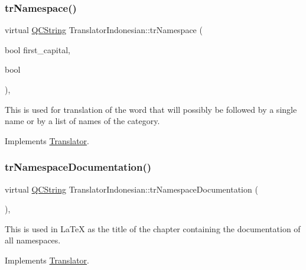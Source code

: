 \subsubsection{\texorpdfstring{trNamespace()}{trNamespace()}}
{\footnotesize\ttfamily virtual \mbox{\hyperlink{class_q_c_string}{Q\+C\+String}} Translator\+Indonesian\+::tr\+Namespace (\begin{DoxyParamCaption}\item[{bool}]{first\+\_\+capital,  }\item[{bool}]{ }\end{DoxyParamCaption})\hspace{0.3cm}{\ttfamily [inline]}, {\ttfamily [virtual]}}

This is used for translation of the word that will possibly be followed by a single name or by a list of names of the category. 

Implements \mbox{\hyperlink{class_translator}{Translator}}.

\mbox{\label{class_translator_indonesian_acdae57e8cc8cc1d1e559900133fe6842}} 
\subsubsection{\texorpdfstring{trNamespaceDocumentation()}{trNamespaceDocumentation()}}
{\footnotesize\ttfamily virtual \mbox{\hyperlink{class_q_c_string}{Q\+C\+String}} Translator\+Indonesian\+::tr\+Namespace\+Documentation (\begin{DoxyParamCaption}{ }\end{DoxyParamCaption})\hspace{0.3cm}{\ttfamily [inline]}, {\ttfamily [virtual]}}

This is used in La\+TeX as the title of the chapter containing the documentation of all namespaces. 

Implements \mbox{\hyperlink{class_translator}{Translator}}.

\mbox{\label{class_translator_indonesian_aeac68f0ab9978e6fc2f8e4a482686e38}} 
